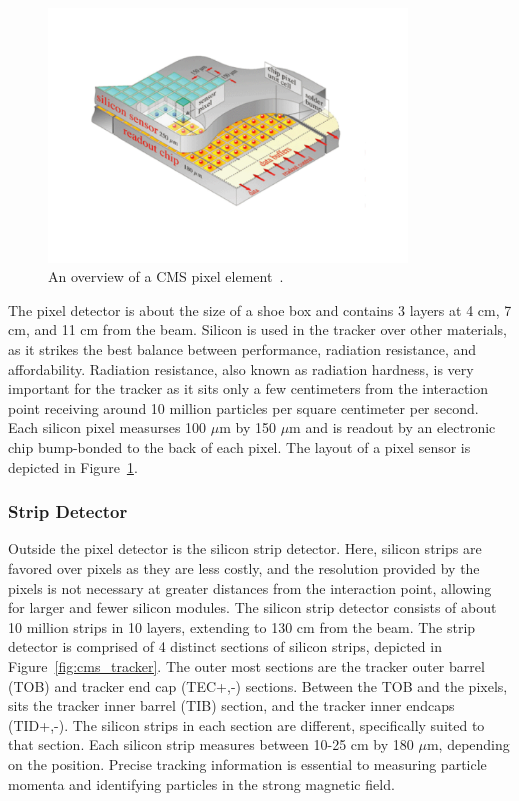 \begin{figure}[hbtp]
 \begin{center}
   \includegraphics[width=0.85\textwidth]{ch3_figs/cms_pixel.pdf}
   \caption[CMS silicon pixel element]{An overview of a CMS pixel element~\cite{cms_pixel}.}
   \label{fig:cms_pixel}
 \end{center}
\end{figure}

\noindent The pixel detector is about the size of a shoe box and contains 3 layers at 4 cm, 7 cm, and 11 cm from the beam.
Silicon is used in the tracker over other materials, as it strikes the best balance between performance, radiation resistance, and affordability. 
Radiation resistance, also known as radiation hardness, is very important for the tracker as it sits only a few centimeters from the interaction point
receiving around 10 million particles per square centimeter per second.
Each silicon pixel measurses 100 $\mu$m by 150 $\mu$m and is readout by an electronic chip bump-bonded to the back of each pixel. The layout of a pixel sensor is depicted in
Figure~\ref{fig:cms_pixel}.  

\subsubsection{Strip Detector}
Outside the pixel detector is the silicon strip detector. Here, silicon strips are favored over pixels as they are less costly, and the resolution provided by the pixels
is not necessary at greater distances from the interaction point, allowing for larger and fewer silicon modules.
The silicon strip detector consists of about 10 million strips in 10 layers, extending to 130 cm from the beam. 
The strip detector is comprised of 4 distinct sections of silicon strips, depicted in
Figure~\ref{fig:cms_tracker}. The outer most sections are the tracker outer barrel (TOB) and tracker end cap (TEC+,-) sections. 
Between the TOB and the pixels, sits the tracker
inner barrel (TIB) section, and the tracker inner endcaps (TID+,-).
The silicon strips in each section are different, specifically suited to that section.
Each silicon strip measures between 10-25 cm by 180 $\mu$m, depending on the position.
Precise tracking information is essential to measuring particle momenta and identifying particles in the strong magnetic field.

